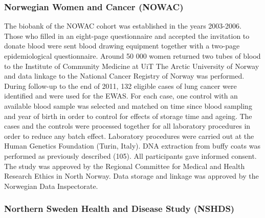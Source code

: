 \documentclass[11pt,twoside]{bristolthesis}
\begin{document}
\hypertarget{norwegian-women-and-cancer-nowac}{%
\subsubsection{Norwegian Women and Cancer (NOWAC)}\label{norwegian-women-and-cancer-nowac}}

The biobank of the NOWAC cohort was established in the years 2003-2006. Those who filled in an eight-page questionnaire and accepted the invitation to donate blood were sent blood drawing equipment together with a two-page epidemiological questionnaire. Around 50 000 women returned two tubes of blood to the Institute of Community Medicine at UiT The Arctic University of Norway and data linkage to the National Cancer Registry of Norway was performed. During follow-up to the end of 2011, 132 eligible cases of lung cancer were identified and were used for the EWAS. For each case, one control with an available blood sample was selected and matched on time since blood sampling and year of birth in order to control for effects of storage time and ageing. The cases and the controls were processed together for all laboratory procedures in order to reduce any batch effect. Laboratory procedures were carried out at the Human Genetics Foundation (Turin, Italy). DNA extraction from buffy coats was performed as previously described (105). All participants gave informed consent. The study was approved by the Regional Committee for Medical and Health Research Ethics in North Norway. Data storage and linkage was approved by the Norwegian Data Inspectorate.

\hypertarget{northern-sweden-health-and-disease-study-nshds}{%
\subsubsection{Northern Sweden Health and Disease Study (NSHDS)}\label{northern-sweden-health-and-disease-study-nshds}}
\end{document}
